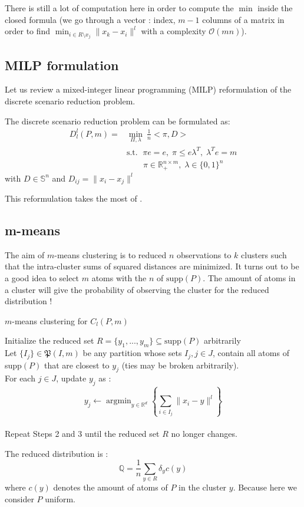 \documentclass{amsart}
\newcommand{\argmin}{\mathop{\arg\min}}
\newcommand{\RR}{\mathbb{R}}
\begin{document}
There is still a lot of computation here in order to compute the $\min$ inside the closed formula (we go through a vector : index, $m-1$ columns of a matrix in order to find $\min_{i\in R\setminus x_j}\lVert x_k-x_i\rVert^l$ with a complexity $\mathcal{O}\left(mn\right)$). 

\subsection{MILP formulation}
Let us review a mixed-integer linear programming (MILP) reformulation of the discrete scenario reduction problem.
\begin{theorem}
The discrete scenario reduction problem can be formulated as: 
\begin{align*}
    D_l^l\left(P,m\right)=&\min_{\Pi,\lambda}\:\frac{1}{n}<\pi,D> \\ &\text{s.t. } \;\pi e=e, \; \pi \leq e\lambda^T,\; \lambda^Te=m\\&\quad\quad \pi\in\RR^{n\times m}_+, \; \lambda\in\{0,1\}^n
    \end{align*}
    with $D\in \mathbb{S}^n$ and $D_{ij}=\lVert x_i-x_j\rVert^l$
\end{theorem}
\begin{remark}
    This reformulation takes the most of .
\end{remark}
\subsection{m-means}
The aim of $m$-means clustering is to reduced $n$ observations to $k$ clusters such that the intra-cluster sums of squared distances are minimized. It turns out to be a good idea to select $m$ atoms with the $n$ of $\text{supp}\left(P\right)$. The amount of atoms in a cluster will give the probability of observing the cluster for the reduced distribution !


\begin{algorithm}
    \caption{$m$-means clustering for $C_l\left(P,m\right)$}\label{k m}
    Initialize the reduced set $R=\{y_1,...,y_m\} \subseteq \text{supp}\left(P\right)$ arbitrarily \\ Let $\{I_j\}\in\mathfrak{P}\left(I,m\right)$ be any partition whose sets $I_j, j\in J$, contain all atoms of supp$\left(P\right)$ that are closest to $y_j$ (ties may be broken arbitrarily). \\ For each $j\in J$, update $y_j$ as : $$y_j \gets \argmin_{y\in\RR^d} \left\{ \sum_{i\in I_j}\lVert x_i-y\rVert^l\right\}$$ \\ Repeat Steps 2 and 3 until the reduced set $R$ no longer changes.
\end{algorithm}
The reduced distribution is :
$$
\mathbb{Q}=\frac{1}{n}\sum_{y\in R}\delta_{y}c\left(y\right)
$$
where $ c\left(y\right)$ denotes the amount of atoms of $P$ in the cluster $y$. Because here we consider $P$ uniform.
\end{document}
